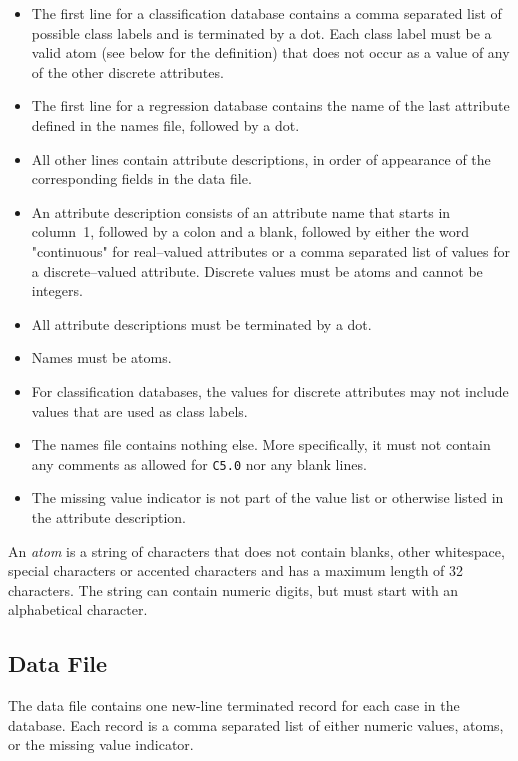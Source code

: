 \documentclass[a4paper,10pt,twoside]{article}
\begin{document}
\begin{itemize}
\item The first line for a classification database contains a comma
separated list of possible class labels and is terminated by a dot. 
Each class label must be a valid atom (see below for the definition) 
that does not occur as a value of any of the other discrete attributes.
\item The first line for a regression database contains the
name of the last attribute defined in the names file, followed by a dot.
\item All other lines contain attribute descriptions, in order
of appearance of the corresponding fields in the data file.
\item An attribute description consists of an attribute name that starts 
in column~1, followed by a colon and a blank, followed by either the
word  "continuous" for real--valued attributes or a comma separated
list of values for a discrete--valued attribute. Discrete values 
must be atoms and cannot be integers. 
\item All attribute descriptions must be terminated by a dot.
\item Names must be atoms.
\item For classification databases, the values for discrete
attributes may not include values that are used as class labels.
\item The names file contains nothing else. More specifically, it must
not contain any comments as allowed for \texttt{C5.0} nor any blank
lines.
\item The missing value indicator is not part of the value list
or otherwise listed in the attribute description.
\end{itemize}

An \emph{atom} is a string of characters that does not contain
blanks, other whitespace, special characters or accented characters
and has a maximum length of 32 characters. The string can contain 
numeric digits, but must  start with an alphabetical character.


\subsection{Data File}

The data file contains one new-line terminated record for each case
in the database. Each record is a comma separated list of either 
numeric values, atoms, or the missing value indicator.
\end{document}
